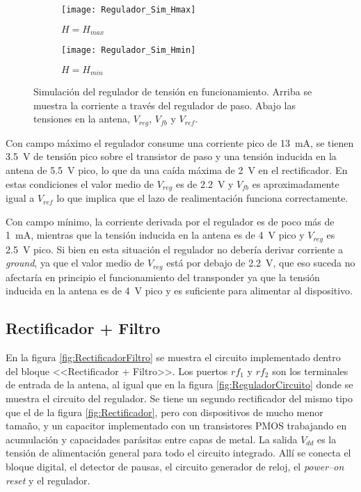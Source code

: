 \begin{figure}
	\centering
	\begin{subfigure}[b]{0.48\textwidth}
		\centering
		\texttt{[image: Regulador\_Sim\_Hmax]}
		\caption{\(H=H_{max}\)}
		\label{fig:ReguladorSimHmax}
	\end{subfigure}
	\quad
    \begin{subfigure}[b]{0.48\textwidth}
	    \centering
		\texttt{[image: Regulador\_Sim\_Hmin]}
		\caption{\(H=H_{min}\)}
		\label{fig:ReguladorSimHmin}
	\end{subfigure}
	\caption{Simulación del regulador de tensión en funcionamiento. 
	Arriba se muestra la corriente a través del regulador de paso. 
	Abajo las tensiones en la antena, \(V_{reg}\), \(V_{fb}\) y 
	\(V_{ref}\).}
	\label{fig:ReguladorSim}
\end{figure}

Con campo máximo el regulador consume una corriente pico de 
\SI{13}{\milli\ampere}, se tienen \SI{3.5}{\volt} de tensión pico 
sobre el transistor de paso y una tensión inducida en la antena de 
\SI{5.5}{\volt} pico, lo que da una caída máxima de \SI{2}{\volt} en 
el rectificador. En estas condiciones el valor medio de \(V_{reg}\) es 
de \SI{2.2}{\volt} y \(V_{fb}\) es aproximadamente igual a \(V_{ref}\) 
lo que implica que el lazo de realimentación funciona correctamente.

Con campo mínimo, la corriente derivada por el regulador es de poco más
de \SI{1}{\milli\ampere}, mientras que la tensión inducida en la 
antena es de \SI{4}{\volt} pico y \(V_{reg}\) es \SI{2.5}{\volt} pico. 
Si bien en esta situación el regulador no debería derivar corriente a 
\emph{ground}, ya que el valor medio de \(V_{reg}\) está por debajo de 
\SI{2.2}{\volt}, que eso suceda no afectaría en principio el 
funcionamiento del transponder ya que la tensión inducida en la antena 
es de \SI{4}{\volt} pico y es suficiente para alimentar al dispositivo.


\subsection{Rectificador + Filtro}

En la figura \ref{fig:RectificadorFiltro} se muestra el circuito 
implementado dentro del bloque <<Rectificador + Filtro>>. Los puertos 
\(rf_{1}\) y \(rf_{2}\) son los terminales de entrada de la antena, al 
igual que en la figura \ref{fig:ReguladorCircuito} donde se muestra 
el circuito del regulador. Se tiene un segundo rectificador del 
mismo tipo que el de la figura \ref{fig:Rectificador}, pero con 
dispositivos de mucho menor tamaño, y un capacitor implementado con 
un transistores PMOS trabajando en acumulación y capacidades 
parásitas entre capas de metal. La salida \(V_{dd}\) es la tensión 
de alimentación general para todo el circuito integrado. Allí se 
conecta el bloque digital, el detector de pausas, el circuito generador 
de reloj, el \emph{power--on reset} y el regulador. 

